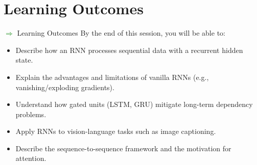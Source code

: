 \section{Learning Outcomes}
\begin{frame}[allowframebreaks]{\textcolor{green}{$\Rightarrow$} Learning Outcomes}
    By the end of this session, you will be able to:
    \begin{itemize}
        \item Describe how an RNN processes sequential data with a recurrent hidden state.
        \item Explain the advantages and limitations of vanilla RNNs (e.g., vanishing/exploding gradients).
        \item Understand how gated units (LSTM, GRU) mitigate long-term dependency problems.
        \item Apply RNNs to vision-language tasks such as image captioning.
        \item Describe the sequence-to-sequence framework and the motivation for attention.
    \end{itemize}
\end{frame}
